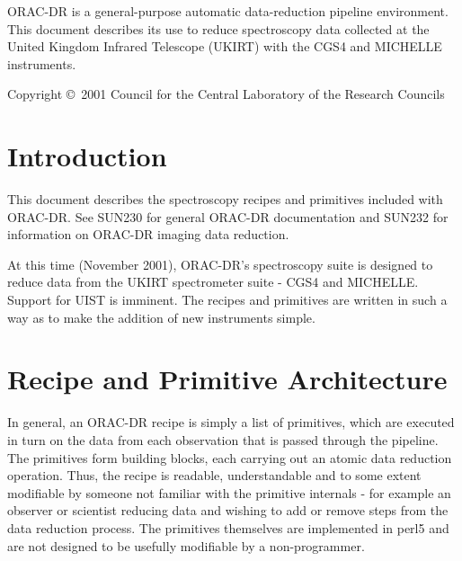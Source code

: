 \documentclass[twoside,11pt]{article}
\newcommand{\stardocinitials}  {SUN}
\newcommand{\stardoccopyright} 
{Copyright \copyright\ 2001 Council for the Central Laboratory of the Research Councils}
\newcommand{\stardocnumber}    {236.1}
\newcommand{\stardocabstract}  {ORAC-DR is a
general-purpose automatic data-reduction pipeline environment.  This
document describes its use to reduce spectroscopy data collected at the
United Kingdom Infrared Telescope (UKIRT) with the CGS4 and MICHELLE
instruments. }
\newcommand{\stardocname}{\stardocinitials /\stardocnumber}
\newenvironment{latexonly}{}{}
\renewcommand{\_}{\texttt{\symbol{95}}}
\renewcommand{\thepage}{\roman{page}}
\begin{document}
\stardocabstract

\begin{latexonly}
\newpage
\vspace*{\fill}
\stardoccopyright
\end{latexonly}

  \newpage
  \begin{latexonly}
    \setlength{\parskip}{0mm}
    \tableofcontents
    \setlength{\parskip}{\medskipamount}
    \markboth{\stardocname}{\stardocname}
  \end{latexonly}

\cleardoublepage
\renewcommand{\thepage}{\arabic{page}}
\setcounter{page}{1}


\section{Introduction}

This document describes the spectroscopy recipes and primitives
included with ORAC-DR. See SUN230 for general ORAC-DR documentation
and SUN232 for information on ORAC-DR imaging data reduction.

At this time (November 2001), ORAC-DR's spectroscopy suite is designed
to reduce data from the UKIRT spectrometer suite - CGS4 and
MICHELLE. Support for UIST is imminent. The recipes and primitives
are written in such a way as to make the addition of new instruments
simple.

\section{Recipe and Primitive Architecture}

In general, an ORAC-DR recipe is simply a list of primitives, which
are executed in turn on the data from each observation that is passed
through the pipeline. The primitives form building blocks, each
carrying out an atomic data reduction operation. Thus, the recipe is
readable, understandable and to some extent modifiable by someone not
familiar with the primitive internals - for example an observer or
scientist reducing data and wishing to add or remove steps from the
data reduction process. The primitives themselves are implemented in
perl5 and are not designed to be usefully modifiable by a
non-programmer.
\end{document}
